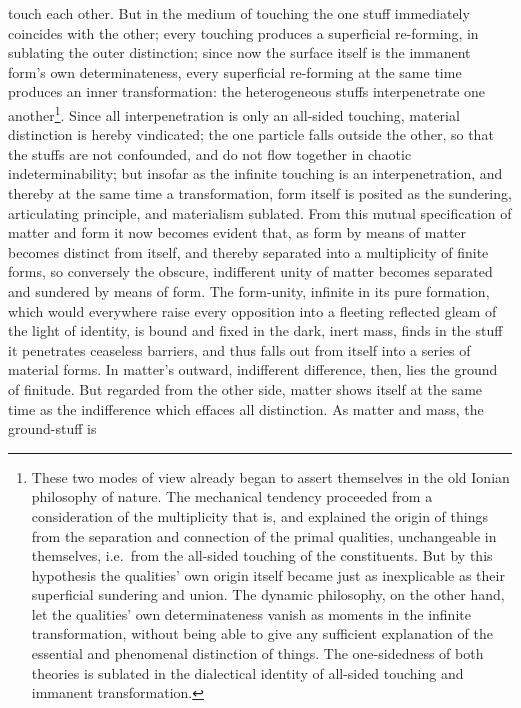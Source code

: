 \documentclass[12pt,a4paper,openany]{book}
\newcommand{\opage}[1]{\marginnote{\footnotesize\textit{[#1]}}}
\begin{document}
touch each other. But in the medium of touching
the one stuff immediately coincides with the
other; every touching produces a superficial re-forming,
in sublating the outer distinction; since now the surface
itself is the immanent form's own determinateness,
every superficial re-forming at the same time produces an
inner transformation: the heterogeneous stuffs interpenetrate
one another\footnote{These two modes of view already began to assert themselves in the old Ionian philosophy of nature. The mechanical tendency proceeded from a consideration of the multiplicity that is, and explained the origin of things from the separation and connection of the primal qualities, unchangeable in themselves, i.e.\ from the all-sided touching of the constituents. But by this hypothesis the qualities' own origin itself became just as inexplicable as their superficial sundering and union. The dynamic philosophy, on the other hand, let the qualities' own determinateness vanish as moments in the infinite transformation, without being able to give any sufficient explanation of the essential and phenomenal distinction of things. The one-sidedness of both theories is sublated in the dialectical identity of all-sided touching and immanent transformation.}. Since all
\setcounter{footnote}{0}%
\opage{152}interpenetration is only an all-sided touching, material
distinction is hereby vindicated; the one particle falls outside
the other, so that the stuffs are not confounded, and
do not flow together in chaotic indeterminability; but insofar as
the infinite touching is an interpenetration, and
thereby at the same time a transformation, form itself is posited
as the sundering, articulating principle, and materialism
sublated. From this mutual specification of matter and form
it now becomes evident that, as form
by means of matter becomes distinct from itself,
and thereby separated into a multiplicity of finite forms,
so conversely the obscure, indifferent unity of matter becomes
separated and sundered by means of form. The form-unity,
infinite in its pure formation, which would everywhere
raise every opposition into a fleeting reflected gleam of
the light of identity, is bound and fixed in the dark, inert
mass, finds in the stuff it penetrates ceaseless
barriers, and thus falls out from itself into
a series of material forms. In matter's outward,
indifferent difference, then, lies the ground of
finitude. But regarded from the other side, matter
shows itself at the same time as the indifference which effaces
all distinction. As matter and mass, the ground-stuff is
\end{document}
